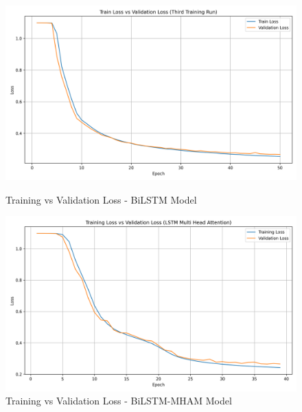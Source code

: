 \documentclass{article}
\begin{document}
\begin{figure}[H]
  \centering
  \begin{minipage}[b]{0.45\textwidth}
    \centering
    \includegraphics[width=0.9\linewidth]{lstm_tc_loss_curve.png}
    \caption{Training vs Validation Loss - BiLSTM Model}
    \label{fig:image1}
  \end{minipage}
  \hfill
  \begin{minipage}[b]{0.45\textwidth}
    \centering
    \includegraphics[width=0.9\linewidth]{lstm_ma_loss_curve.png}
    \caption{Training vs Validation Loss - BiLSTM-MHAM Model}
    \label{fig:image2}
  \end{minipage}
\end{figure}
\end{document}
